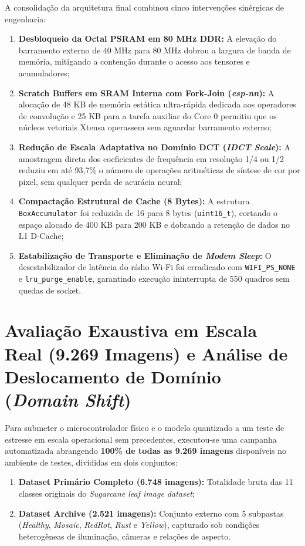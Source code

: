 A consolidação da arquitetura final combinou cinco intervenções sinérgicas de engenharia:
\begin{enumerate}
    \item \textbf{Desbloqueio da Octal PSRAM em 80 MHz DDR:} A elevação do barramento externo de 40 MHz para 80 MHz dobrou a largura de banda de memória, mitigando a contenção durante o acesso aos tensores e acumuladores;
    \item \textbf{Scratch Buffers em SRAM Interna com Fork-Join (\textit{esp-nn}):} A alocação de 48 KB de memória estática ultra-rápida dedicada aos operadores de convolução e 25 KB para a tarefa auxiliar do Core 0 permitiu que os núcleos vetoriais Xtensa operassem sem aguardar barramento externo;
    \item \textbf{Redução de Escala Adaptativa no Domínio DCT (\textit{IDCT Scale}):} A amostragem direta dos coeficientes de frequência em resolução 1/4 ou 1/2 reduziu em até 93,7\% o número de operações aritméticas de síntese de cor por pixel, sem qualquer perda de acurácia neural;
    \item \textbf{Compactação Estrutural de Cache (8 Bytes):} A estrutura \texttt{BoxAccumulator} foi reduzida de 16 para 8 bytes (\texttt{uint16\_t}), cortando o espaço alocado de 400 KB para 200 KB e dobrando a retenção de dados no L1 D-Cache;
    \item \textbf{Estabilização de Transporte e Eliminação de \textit{Modem Sleep}:} O desestabilizador de latência do rádio Wi-Fi foi erradicado com \texttt{WIFI\_PS\_NONE} e \texttt{lru\_purge\_enable}, garantindo execução ininterrupta de 550 quadros sem quedas de socket.
\end{enumerate}

\section{Avaliação Exaustiva em Escala Real (9.269 Imagens) e Análise de Deslocamento de Domínio (\textit{Domain Shift})}

Para submeter o microcontrolador físico e o modelo quantizado a um teste de estresse em escala operacional sem precedentes, executou-se uma campanha automatizada abrangendo \textbf{100\% de todas as 9.269 imagens} disponíveis no ambiente de testes, divididas em dois conjuntos:
\begin{enumerate}
    \item \textbf{Dataset Primário Completo (6.748 imagens):} Totalidade bruta das 11 classes originais do \textit{Sugarcane leaf image dataset};
    \item \textbf{Dataset Archive (2.521 imagens):} Conjunto externo com 5 subpastas (\textit{Healthy}, \textit{Mosaic}, \textit{RedRot}, \textit{Rust} e \textit{Yellow}), capturado sob condições heterogêneas de iluminação, câmeras e relações de aspecto.
\end{enumerate}

